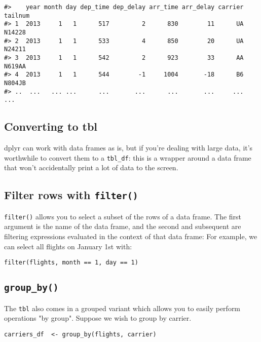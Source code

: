 \documentclass{article}
\begin{document}
\begin{framed}
\begin{verbatim}
#>    year month day dep_time dep_delay arr_time arr_delay carrier tailnum
#> 1  2013     1   1      517         2      830        11      UA  N14228
#> 2  2013     1   1      533         4      850        20      UA  N24211
#> 3  2013     1   1      542         2      923        33      AA  N619AA
#> 4  2013     1   1      544        -1     1004       -18      B6  N804JB
#> ..  ...   ... ...      ...       ...      ...       ...     ...     ...
\end{verbatim}
\end{framed}
\subsection{Converting to tbl}
dplyr can work with data frames as is, but if you’re dealing with large data, it’s worthwhile to convert them to a \texttt{tbl\_df}: this is a wrapper around a data frame that won’t accidentally print a lot of data to the screen.




\subsection{Filter rows with \texttt{filter()}}

\texttt{filter()} allows you to select a subset of the rows of a data frame. The first argument is the name of the data frame, and the second and subsequent are filtering expressions evaluated in the context of that data frame:
For example, we can select all flights on January 1st with:

\begin{framed}
\begin{verbatim}
filter(flights, month == 1, day == 1)
\end{verbatim}
\end{framed}



\subsection{ \texttt{group\_by()}}

The \texttt{tbl} also comes in a grouped variant which allows you to easily perform operations "by group". Suppose we wish to group by carrier.

\begin{verbatim}
carriers_df  <- group_by(flights, carrier)
\end{verbatim}
\end{document}
